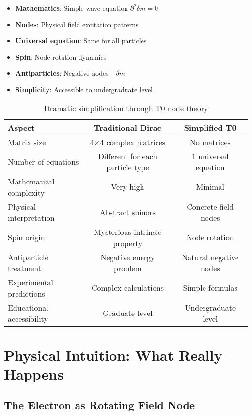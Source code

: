 \documentclass[12pt,a4paper]{article}
\newcommand{\deltam}{\delta m}
\theoremstyle{definition}
\theoremstyle{remark}
\begin{document}
	\begin{itemize}
		\item \textbf{Mathematics}: Simple wave equation $\partial^2 \deltam = 0$
		\item \textbf{Nodes}: Physical field excitation patterns
		\item \textbf{Universal equation}: Same for all particles
		\item \textbf{Spin}: Node rotation dynamics
		\item \textbf{Antiparticles}: Negative nodes $-\deltam$
		\item \textbf{Simplicity}: Accessible to undergraduate level
	\end{itemize}
	
	\begin{table}[htbp]
		\centering
		\begin{tabular}{lcc}
			\toprule
			\textbf{Aspect} & \textbf{Traditional Dirac} & \textbf{Simplified T0} \\
			\midrule
			Matrix size & 4×4 complex matrices & No matrices \\
			Number of equations & Different for each particle type & 1 universal equation \\
			Mathematical complexity & Very high & Minimal \\
			Physical interpretation & Abstract spinors & Concrete field nodes \\
			Spin origin & Mysterious intrinsic property & Node rotation \\
			Antiparticle treatment & Negative energy problem & Natural negative nodes \\
			Experimental predictions & Complex calculations & Simple formulas \\
			Educational accessibility & Graduate level & Undergraduate level \\
			\bottomrule
		\end{tabular}
		\caption{Dramatic simplification through T0 node theory}
		\label{tab:dirac_comparison}
	\end{table}
	
	\section{Physical Intuition: What Really Happens}
	
	\subsection{The Electron as Rotating Field Node}
	
\end{document}
